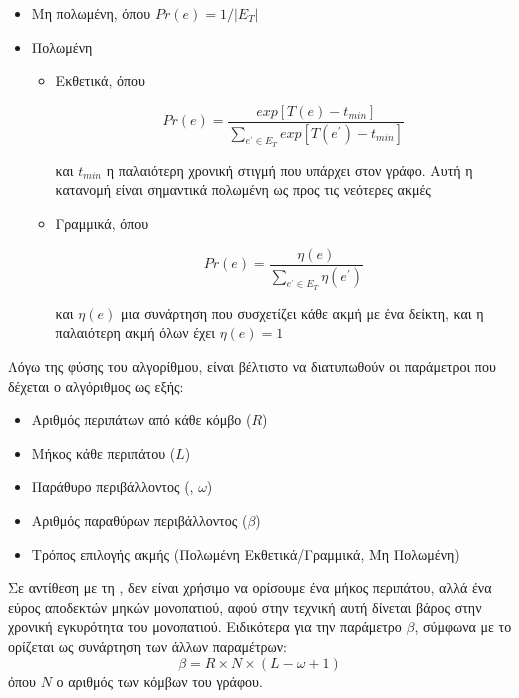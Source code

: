 \begin{itemize}
    \item Μη πολωμένη, όπου \(Pr(e) = 1/|E_T|\)
    \item Πολωμένη\begin{itemize}
            \item Εκθετικά, όπου 
            
            \begin{equation}
                Pr(e) = \frac{exp[T(e) - t_{min}]}
                {\sum_{e^{'} \in E_T} exp[T(e^{'}) - t_{min}]}
            \end{equation}
            
            και \(t_{min}\) η παλαιότερη χρονική στιγμή που υπάρχει στον γράφο. 
            Αυτή η κατανομή είναι σημαντικά πολωμένη ως προς τις νεότερες ακμές
            
            \item Γραμμικά, όπου
            
            \begin{equation}
                Pr(e) = \frac{\eta(e)}{\sum_{e^{'} \in E_T} \eta(e^{'})}
            \end{equation}
            
            και \(\eta(e)\) μια συνάρτηση που συσχετίζει κάθε ακμή με ένα δείκτη, και η
            παλαιότερη ακμή όλων έχει \(\eta(e) = 1\)
            
        \end{itemize}
\end{itemize}

Λόγω της φύσης του αλγορίθμου, είναι βέλτιστο να διατυπωθούν οι παράμετροι που δέχεται ο
αλγόριθμος ως εξής:

\begin{itemize}
    \item Αριθμός περιπάτων από κάθε κόμβο (\(R\))
    \item Μήκος κάθε περιπάτου (\(L\))
    \item Παράθυρο περιβάλλοντος (, \(\omega\))
    \item Αριθμός παραθύρων περιβάλλοντος (\(\beta\))
    \item Τρόπος επιλογής ακμής (Πολωμένη Εκθετικά/Γραμμικά, Μη Πολωμένη)
\end{itemize}

Σε αντίθεση με τη , δεν είναι χρήσιμο να ορίσουμε ένα μήκος περιπάτου, αλλά ένα
εύρος αποδεκτών μηκών μονοπατιού, αφού στην τεχνική αυτή δίνεται βάρος στην χρονική
εγκυρότητα του μονοπατιού. Ειδικότερα για την παράμετρο \(\beta\), σύμφωνα με το
\cite{CTDNE} ορίζεται ως συνάρτηση των άλλων παραμέτρων:
\begin{equation} \label{2.19}
    \beta = R \times N \times ( L - \omega + 1)
\end{equation}
όπου \(N\) ο αριθμός των κόμβων του γράφου.

